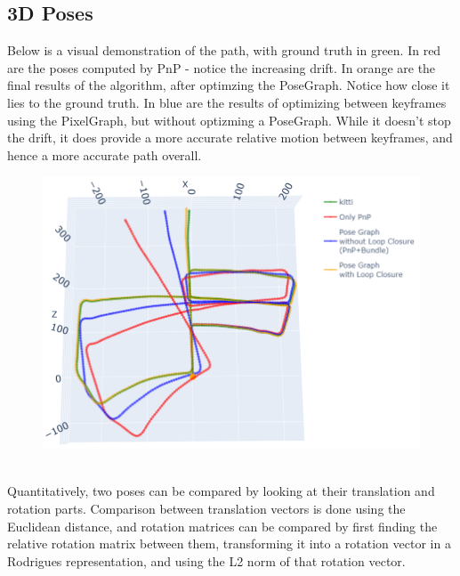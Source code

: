 \documentclass[12pt]{article}
\begin{document}
\subsection{3D Poses}
Below is a visual demonstration of the path, with ground truth in green. In red are the poses computed by PnP - notice the increasing drift. In orange are the final results of the algorithm, after optimzing the PoseGraph. Notice how close it lies to the ground truth. In blue are the results of optimizing between keyframes using the PixelGraph, but without optizming a PoseGraph. While it doesn't stop the drift, it does provide a more accurate relative motion between keyframes, and hence a more accurate path overall.
\begin{figure}[h]
\centering \includegraphics[width=\textwidth]{3D-locations}
\end{figure} \\
Quantitatively, two poses can be compared by looking at their translation and rotation parts. Comparison between translation vectors is done using the Euclidean distance, and rotation matrices can be compared by first finding the relative rotation matrix between them, transforming it into a rotation vector in a Rodrigues representation, and using the L2 norm of that rotation vector. 
\newpage
\end{document}
